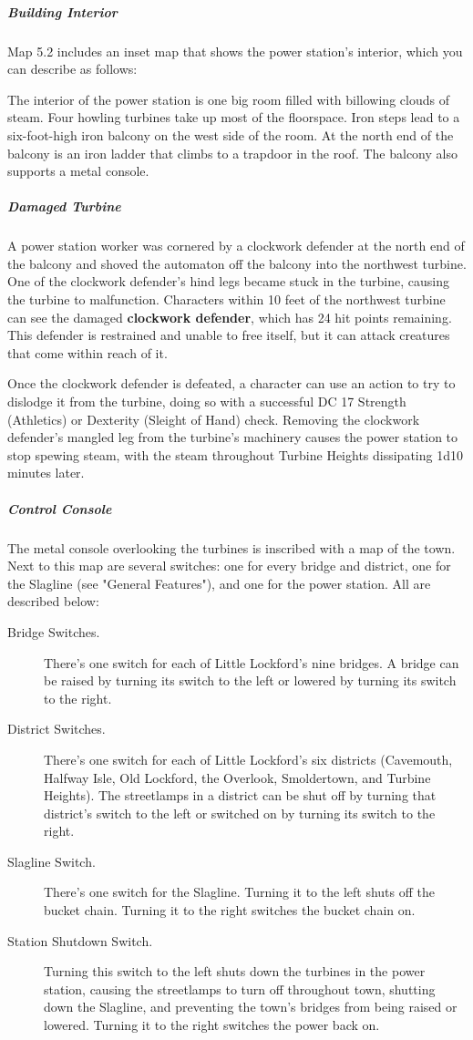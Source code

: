 \documentclass[10pt,a4paper,twoside,bg=print,twocolumn,openany,nodeprecatedcode]{dndbook}
\begin{document}
\subparagraph{Building Interior}
Map 5.2 includes an inset map that shows the power station's interior, which you can describe as follows:

\begin{DndReadAloud}{}
The interior of the power station is one big room filled with billowing clouds of steam. Four howling turbines take up most of the floorspace. Iron steps lead to a six-foot-high iron balcony on the west side of the room. At the north end of the balcony is an iron ladder that climbs to a trapdoor in the roof. The balcony also supports a metal console.

\end{DndReadAloud}

\subparagraph{Damaged Turbine}
A power station worker was cornered by a clockwork defender at the north end of the balcony and shoved the automaton off the balcony into the northwest turbine. One of the clockwork defender's hind legs became stuck in the turbine, causing the turbine to malfunction. Characters within 10 feet of the northwest turbine can see the damaged \textbf{clockwork defender}, which has 24 hit points remaining. This defender is restrained and unable to free itself, but it can attack creatures that come within reach of it.

Once the clockwork defender is defeated, a character can use an action to try to dislodge it from the turbine, doing so with a successful DC 17 Strength (Athletics) or Dexterity (Sleight of Hand) check. Removing the clockwork defender's mangled leg from the turbine's machinery causes the power station to stop spewing steam, with the steam throughout Turbine Heights dissipating 1d10 minutes later.

\subparagraph{Control Console}
The metal console overlooking the turbines is inscribed with a map of the town. Next to this map are several switches: one for every bridge and district, one for the Slagline (see "General Features"), and one for the power station. All are described below:


\begin{description}
\item[Bridge Switches.]
There's one switch for each of Little Lockford's nine bridges. A bridge can be raised by turning its switch to the left or lowered by turning its switch to the right.
\item[District Switches.]
There's one switch for each of Little Lockford's six districts (Cavemouth, Halfway Isle, Old Lockford, the Overlook, Smoldertown, and Turbine Heights). The streetlamps in a district can be shut off by turning that district's switch to the left or switched on by turning its switch to the right.
\item[Slagline Switch.]
There's one switch for the Slagline. Turning it to the left shuts off the bucket chain. Turning it to the right switches the bucket chain on.
\item[Station Shutdown Switch.]
Turning this switch to the left shuts down the turbines in the power station, causing the streetlamps to turn off throughout town, shutting down the Slagline, and preventing the town's bridges from being raised or lowered. Turning it to the right switches the power back on.
\end{description}
\end{document}
